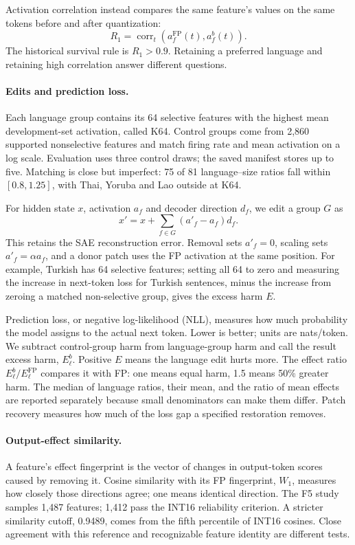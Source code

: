 \documentclass[11pt]{article}
\begin{document}
Activation correlation instead compares the same feature's values on the same tokens before and after quantization:
\begin{equation}
 R_1=\operatorname{corr}_t(a_f^{\mathrm{FP}}(t),a_f^b(t)).
\end{equation}
The historical survival rule is $R_1>0.9$. Retaining a preferred language and retaining high correlation answer different questions.

\paragraph{Edits and prediction loss.}
Each language group contains its 64 selective features with the highest mean development-set activation, called K64. Control groups come from 2,860 supported nonselective features and match firing rate and mean activation on a log scale. Evaluation uses three control draws; the saved manifest stores up to five. Matching is close but imperfect: 75 of 81 language--size ratios fall within $[0.8,1.25]$, with Thai, Yoruba and Lao outside at K64.

For hidden state $x$, activation $a_f$ and decoder direction $d_f$, we edit a group $G$ as
\begin{equation}
 x'=x+\sum_{f\in G}(a'_f-a_f)d_f.
\end{equation}
This retains the SAE reconstruction error. Removal sets $a'_f=0$, scaling sets $a'_f=\alpha a_f$, and a donor patch uses the FP activation at the same position. For example, Turkish has 64 selective features; setting all 64 to zero and measuring the increase in next-token loss for Turkish sentences, minus the increase from zeroing a matched non-selective group, gives the excess harm $E$.

Prediction loss, or negative log-likelihood (NLL), measures how much probability the model assigns to the actual next token. Lower is better; units are nats/token. We subtract control-group harm from language-group harm and call the result excess harm, $E_\ell^b$. Positive $E$ means the language edit hurts more. The effect ratio $E_\ell^b/E_\ell^{\mathrm{FP}}$ compares it with FP: one means equal harm, 1.5 means 50\% greater harm. The median of language ratios, their mean, and the ratio of mean effects are reported separately because small denominators can make them differ. Patch recovery measures how much of the loss gap a specified restoration removes.

\paragraph{Output-effect similarity.}
A feature's effect fingerprint is the vector of changes in output-token scores caused by removing it. Cosine similarity with its FP fingerprint, $W_1$, measures how closely those directions agree; one means identical direction. The F5 study samples 1,487 features; 1,412 pass the INT16 reliability criterion. A stricter similarity cutoff, 0.9489, comes from the fifth percentile of INT16 cosines. Close agreement with this reference and recognizable feature identity are different tests.
\end{document}
